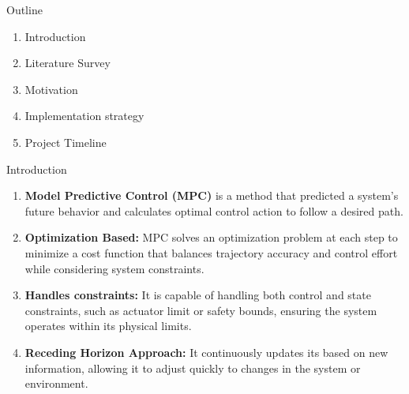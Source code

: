 \documentclass{beamer}
\begin{document}
\begin{frame}\titlepage\end{frame}


\begin{frame}{Outline}
	\begin{enumerate}
		\item Introduction
		\item Literature Survey
		\item Motivation
		\item Implementation strategy
		\item Project Timeline
	\end{enumerate}
\end{frame}


\begin{frame}{Introduction}
	\begin{enumerate}
		\item \textbf{Model Predictive Control (MPC)} is a method that predicted a system's future behavior and calculates optimal control action to follow a desired path.
		\item \textbf{Optimization Based:} MPC solves an optimization problem at each step to minimize a cost function that balances trajectory accuracy and control effort while considering system constraints.
		\item \textbf{Handles constraints:} It is capable of handling both control and state constraints, such as actuator limit or safety bounds, ensuring the system operates within its physical limits.
		\item \textbf{Receding Horizon Approach:} It continuously updates its based on new information, allowing it to adjust quickly to changes in the system or environment.
	\end{enumerate}
\end{frame}\normalfont
\end{document}
